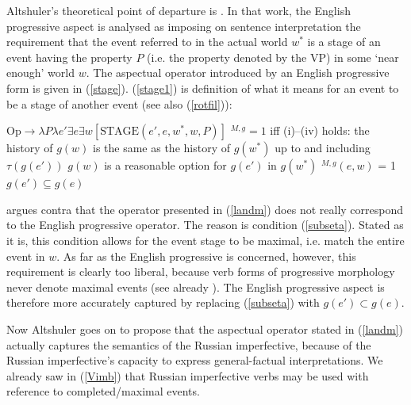 \documentclass[output=paper,colorlinks,citecolor=brown]{langscibook}
\begin{document}
Altshuler's theoretical point of departure is \citet{Landman92}. In that work, 
the English progressive aspect is analysed as imposing on sentence interpretation the requirement that the event referred to in the actual world $w^*$ is a stage of an event having the property $P$ (i.e. the property denoted by the VP) in some `near enough' world $w$. The aspectual operator introduced by an English progressive form is given in (\ref{stage}). 
(\ref{stage1})
is  definition of what it means for an event to be a stage of another event (see also (\ref{rotfil})):

\ea\label{landm} \ea\label{stage} $\text{Op} \rightarrow \lambda P \lambda e' \exists e \exists w [\text{STAGE}(e', e, w^*, w, P)]$
\ex\label{stage1} $^{M,g}=1$ iff (i)--(iv) holds:
\ea the history of $g(w)$ is the same as the history of $g(w^*)$ up to and including $\tau(g(e'))$
\ex $g(w)$ is a reasonable option for $g(e')$ in $g(w^*)$
\ex {}$^{M,g}(e,w)$ = 1
\ex\label{subseta} $g(e')\subseteq g(e)$
\z\z
\z

\noindent \citet{Altshuler2014} argues contra \citet{Landman92} that the operator presented in (\ref{landm}) does not really correspond to the English progressive operator.  
The reason is condition (\ref{subseta}). Stated as it is, this condition allows for the event stage to be maximal, i.e. match the entire event in $w$. As far as the English progressive is concerned, however, this requirement is clearly too liberal, because verb forms of progressive morphology never denote maximal events (see already \citealt[53]{Filip2000}). The English progressive aspect is therefore more accurately captured by replacing (\ref{subseta}) with $g(e')\subset g(e)$.

Now Altshuler goes on to propose that the aspectual operator stated in (\ref{landm}) actually captures the semantics of the Russian imperfective, because of the Russian imperfective's capacity to express general-factual interpretations. 
We already saw in (\ref{Vimb}) that
Russian imperfective verbs may be used with reference to completed/maximal events. 

\end{document}
